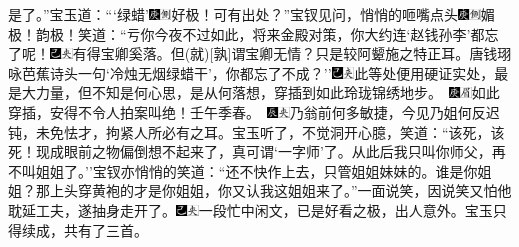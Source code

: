 是了。''宝玉道：```绿蜡'{\includegraphics[width=3mm]{../Images/00004}\includegraphics[width=3mm]{../Images/00011}\footnotesize \kaishu 好极！}可有出处？''宝钗见问，悄悄的咂嘴点头{\includegraphics[width=3mm]{../Images/00004}\includegraphics[width=3mm]{../Images/00011}\footnotesize \kaishu 媚极！韵极！}笑道：``亏你今夜不过如此，将来金殿对策，你大约连`赵钱孙李'都忘了呢！{\includegraphics[width=3mm]{../Images/00003}\includegraphics[width=3mm]{../Images/00012}\footnotesize \kaishu 有得宝卿奚落。但{(就)}{[}孰{]}谓宝卿无情？只是较阿颦施之特正耳。}唐钱珝咏芭蕉诗头一句`冷烛无烟绿蜡干'，你都忘了不成？''{\includegraphics[width=3mm]{../Images/00003}\includegraphics[width=3mm]{../Images/00012}\footnotesize \kaishu 此等处便用硬证实处，最是大力量，但不知是何心思，是从何落想，穿插到如此玲珑锦绣地步。　{\includegraphics[width=3mm]{../Images/00004}\includegraphics[width=3mm]{../Images/00010}\footnotesize \kaishu 如此穿插，安得不令人拍案叫绝！壬午季春。　}\includegraphics[width=3mm]{../Images/00009}\includegraphics[width=3mm]{../Images/00012}\footnotesize \kaishu 乃翁前何多敏捷，今见乃姐何反迟钝，未免怯才，拘紧人所必有之耳。}宝玉听了，不觉洞开心臆，笑道：``该死，该死！现成眼前之物偏倒想不起来了，真可谓`一字师'了。从此后我只叫你师父，再不叫姐姐了。''宝钗亦悄悄的笑道：``还不快作上去，只管姐姐妹妹的。谁是你姐姐？那上头穿黄袍的才是你姐姐，你又认我这姐姐来了。''一面说笑，因说笑又怕他耽延工夫，遂抽身走开了。{\includegraphics[width=3mm]{../Images/00003}\includegraphics[width=3mm]{../Images/00012}\footnotesize \kaishu 一段忙中闲文，已是好看之极，出人意外。}宝玉只得续成，共有了三首。

